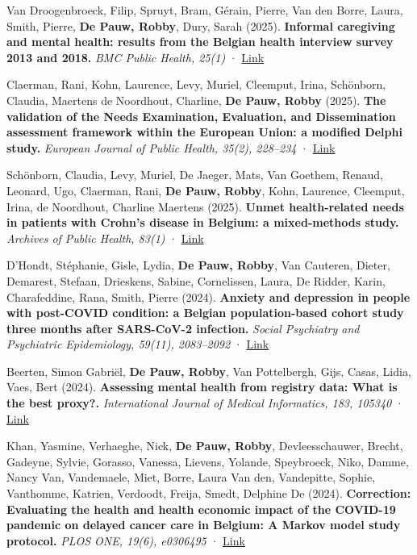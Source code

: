 \documentclass[
  letterpaper,
  DIV=11,
  numbers=noendperiod]{scrartcl}
\begin{document}
Van Droogenbroeck, Filip, Spruyt, Bram, Gérain, Pierre, Van den Borre,
Laura, Smith, Pierre, \textbf{De Pauw, Robby}, Dury, Sarah (2025).
\textbf{Informal caregiving and mental health: results from the Belgian
health interview survey 2013 and 2018.} \emph{BMC Public Health, 25(1)}
· \href{http://dx.doi.org/10.1186/S12889-024-20957-0}{Link}

Claerman, Rani, Kohn, Laurence, Levy, Muriel, Cleemput, Irina,
Schönborn, Claudia, Maertens de Noordhout, Charline, \textbf{De Pauw,
Robby} (2025). \textbf{The validation of the Needs Examination,
Evaluation, and Dissemination assessment framework within the European
Union: a modified Delphi study.} \emph{European Journal of Public
Health, 35(2), 228--234} ·
\href{http://dx.doi.org/10.1093/EURPUB/CKAF027}{Link}

Schönborn, Claudia, Levy, Muriel, De Jaeger, Mats, Van Goethem, Renaud,
Leonard, Ugo, Claerman, Rani, \textbf{De Pauw, Robby}, Kohn, Laurence,
Cleemput, Irina, de Noordhout, Charline Maertens (2025). \textbf{Unmet
health-related needs in patients with Crohn's disease in Belgium: a
mixed-methods study.} \emph{Archives of Public Health, 83(1)} ·
\href{http://dx.doi.org/10.1186/S13690-025-01632-1}{Link}

D'Hondt, Stéphanie, Gisle, Lydia, \textbf{De Pauw, Robby}, Van Cauteren,
Dieter, Demarest, Stefaan, Drieskens, Sabine, Cornelissen, Laura, De
Ridder, Karin, Charafeddine, Rana, Smith, Pierre (2024). \textbf{Anxiety
and depression in people with post-COVID condition: a Belgian
population-based cohort study three months after SARS-CoV-2 infection.}
\emph{Social Psychiatry and Psychiatric Epidemiology, 59(11),
2083--2092} · \href{http://dx.doi.org/10.1007/S00127-024-02655-9}{Link}

Beerten, Simon Gabriël, \textbf{De Pauw, Robby}, Van Pottelbergh, Gijs,
Casas, Lidia, Vaes, Bert (2024). \textbf{Assessing mental health from
registry data: What is the best proxy?.} \emph{International Journal of
Medical Informatics, 183, 105340} ·
\href{http://dx.doi.org/10.1016/J.IJMEDINF.2024.105340}{Link}

Khan, Yasmine, Verhaeghe, Nick, \textbf{De Pauw, Robby},
Devleesschauwer, Brecht, Gadeyne, Sylvie, Gorasso, Vanessa, Lievens,
Yolande, Speybroeck, Niko, Damme, Nancy Van, Vandemaele, Miet, Borre,
Laura Van den, Vandepitte, Sophie, Vanthomme, Katrien, Verdoodt, Freija,
Smedt, Delphine De (2024). \textbf{Correction: Evaluating the health and
health economic impact of the COVID-19 pandemic on delayed cancer care
in Belgium: A Markov model study protocol.} \emph{PLOS ONE, 19(6),
e0306495} · \href{http://dx.doi.org/10.1371/JOURNAL.PONE.0306495}{Link}
\end{document}

